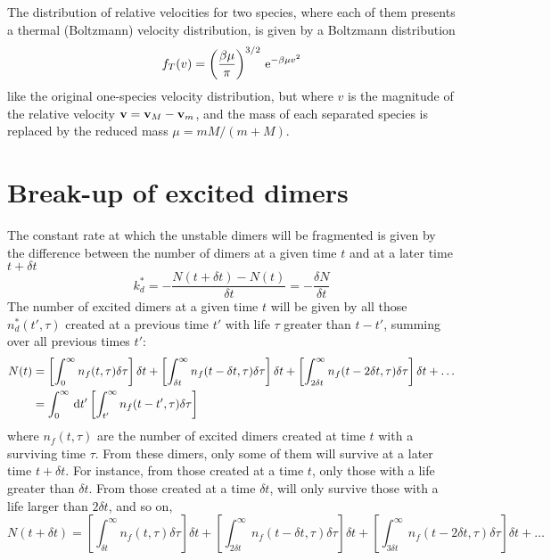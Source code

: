 The distribution of relative velocities for two species, where each of them presents a thermal (Boltzmann) velocity distribution, is given by a Boltzmann distribution
\begin{equation}
  \label{Q:rates-relat-veloc-distrib}
  f_{T}(v) = \left( \frac{\beta \mu}{\pi} \right)^{3/2} \, \mathrm{e}^{- \beta \mu v^{2}}
\end{equation}
like the original one-species velocity distribution, but where $v$ is the magnitude of the relative velocity $\mathbf{v} = \mathbf{v}_{M}- \mathbf{v}_{m}$, and the mass of each separated species is replaced by the reduced mass $\mu = m M /(m + M)$.


\section{Break-up of excited dimers}
\label{S:fragm-excit-dimers}

The constant rate at which the unstable dimers will be fragmented is given by the difference between the number of dimers at a given time $t$ and at a later time $t + \delta t$
\begin{equation*}
  k_{d}^{*} = - \frac{N(t+ \delta t) - N(t)}{\delta t} = -\frac{\delta N}{\delta t}
\end{equation*}
The number of excited dimers at a given time $t$ will be given by all those $n_{d}^{*}(t',\tau)$ created at a previous time $t'$ with life $\tau$  greater than $t-t'$, summing over all previous times $t'$:
\begin{align}
  \label{Q:rates-number-excit-dimers-t}
  N(t) &= \left[\int_{0}^{\infty} n_{f}(t,\tau) \delta \tau \right] \delta t + \left[\int_{\delta t}^{\infty} n_{f}(t-\delta t,\tau) \delta \tau \right] \delta t + \left[\int_{2 \delta t}^{\infty} n_{f}(t-2 \delta t,\tau) \delta \tau \right] \delta t + \dots \nonumber \\
       &= \int_{0}^{\infty} \,\mathrm{d} t' \left[\int_{t'}^{\infty} n_{f}(t-t',\tau) \delta \tau \right] 
\end{align}
where $n_{f}(t,\tau)$ are the number of excited dimers created at time $t$ with a surviving time $\tau$.
From these dimers, only some of them will survive at a later time $t + \delta t$. For instance, from those created at a time $t$, only those with a life greater than $\delta t$. From those created at a time $\delta t$, will only survive those with a life larger than $2 \delta t$, and so on,
%
\begin{equation}
  \label{Q:rates-number-excit-dimers-t+dt}
  N(t+\delta t) = \left[\int_{\delta t}^{\infty} n_{f}(t,\tau) \delta \tau \right] \delta t + \left[\int_{2 \delta t}^{\infty} n_{f}(t-\delta t,\tau) \delta \tau \right] \delta t + \left[\int_{3 \delta t}^{\infty} n_{f}(t-2 \delta t,\tau) \delta \tau \right] \delta t + \dots
\end{equation}

